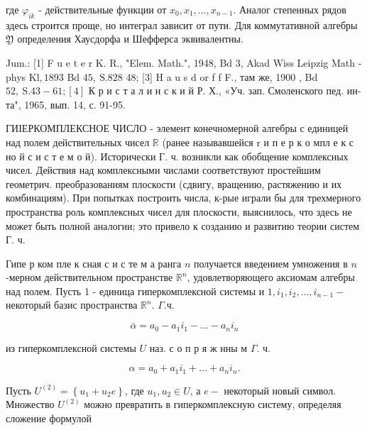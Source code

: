 \documentclass[10pt]{article}
\begin{document}
где $\varphi_{i k}$ - действительные функции от $x_{0}, x_{1}, \ldots, x_{n-1}$. Аналог степенных рядов здесь строится проще, но интеграл зависит от пути. Для коммутативной алгебры $\mathfrak{Y}$ определения Хаусдорфа и Шефферса эквивалентны.



Jum.: [1] F u e t e r K. R., "Elem. Math.", 1948, Bd 3, Akad Wiss Leipzig Math -phys $\mathrm{Kl}, 1893$ Bd $45, \mathrm{~S} .828$ 48; [3] H a u s d or f f F., там же, 1900 , Bd $52, \mathrm{~S} .43-61 ;[4]$ К р и с т а л и н с к и й Р. Х., «Уч. зап. Смоленского пед. ин-та", 1965, вып. 14, с. 91-95.



ГИІЕРКОМПЛЕКСНОЕ ЧИСЛО - элемент конечномерной алгебры с единицей над полем действительных чисел $\mathbb{R}$ (ранее называвшейся $\mathrm{r}$ и п е р к о мпл е к с но й с и с т е м о й). Исторически Г. ч. возникли как обобщение комплексных чисел. Действия над комплексными числами соответствуют простейшим геометрич. преобразованиям плоскости (сдвигу, вращению, растяжению и их комбинациям). При попытках построить числа, к-рые играли бы для трехмерного пространства роль комплексных чисел для плоскости, выяснилось, что здесь не может быть полной аналогии; это привело к созданию и развитию теории систем Г. ч.



Гипе р ком пле к сная с и с те м а ранга $n$ получается введением умножения в $n$-мерном действительном пространстве $\mathbb{R}^{n}$, удовлетворяющего аксиомам алгебры над полем. Пусть 1 - единица гиперкомплексной системы и $1, i_{1}, i_{2}, \ldots, i_{n-1}-$ некоторый базис пространства $\mathbb{R}^{n}$. $\Gamma$.ч.



\[

\bar{\alpha}=a_{0}-a_{1} i_{1}-\ldots-a_{n} i_{n}

\]



из гиперкомплексной системы $U$ наз. с о п р я ж нны м $\Gamma$. ч.



\[

\alpha=a_{0}+a_{1} i_{1}+\ldots+a_{n} i_{n} .

\]



Пусть $U^{(2)}=\left\{u_{1}+u_{2} e\right\}$, где $u_{1}, u_{2} \in U$, а $e-$ некоторый новый символ. Множество $U^{(2)}$ можно превратить в гиперкомплексную систему, определяя сложение формулой
\end{document}
